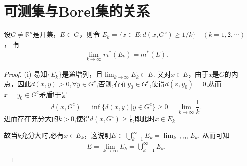 \documentclass[../../main.tex]{subfiles}
\begin{document}
\section{可测集与Borel集的关系}

\begin{lemma}[Carathéodory引理]\label{lemma:卡拉西奥多里引理}
设$G\neq\mathbb{R}^n$是开集，$E\subset G$，则令
$E_k = \{x\in E:d(x,G^c)\geqslant 1/k\}\quad (k = 1,2,\cdots)$，
有
\begin{align*}
\lim_{k\to\infty}m^*(E_k)=m^*(E).
\end{align*}
\end{lemma}
\begin{proof}
(i) 易知$\{E_k\}$是递增列，且$\lim_{k\to\infty}E_k\subset E$. 又对$x\in E$，由于$x$是$G$的内点，因此$d(x,y)>0,\forall y\in G^c$,否则,存在$y_0\in G^c$,使得$d(x,y_0)=0$,从而$x=y_0\in G^c$矛盾!于是$$d(x,G^c)=\inf\{d(x,y)|y\in G^c\} \geq 0=\lim_{k\to \infty}\frac{1}{k}.$$
进而存在充分大的$k>0$,使得$d(x,G^c)\geqslant \frac{1}{k}$,即此时$x\in E_k$.

故当$k$充分大时,必有$x\in E_k$，这说明$E\subset\bigcup_{k = 1}^{\infty}E_k=\lim_{k\to\infty}E_k$. 从而可知
\begin{align*}
E=\lim_{k\to\infty}E_k=\bigcup_{k = 1}^{\infty}E_k.
\end{align*}


\end{proof}
\end{document}
